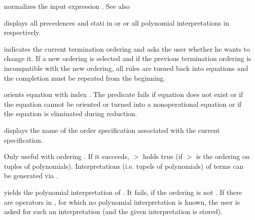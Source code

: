 \begin{command}
normalizes the input expression .
See also 
\end{command}


\begin{command}
displays all precedences and stati in  or  or
all polynomial interpretations in  respectively.
\end{command}

\begin{command}
indicates the current termination ordering and asks the user whether he wants to 
change it.
If a new ordering is selected and if the previous termination
ordering is incompatible with the new ordering, all rules are turned back into
equations and the completion must be repeated from the beginning.
\end{command}

\begin{command}
orients equation with index . The predicate fails if equation 
 does
not exist or if the equation cannot be oriented or turned into a nonoperational
equation or if the equation is eliminated during reduction.
\end{command}

\begin{command}
displays the name of the order specification associated with
the current specification.
\end{command}

\begin{command}
Only useful with ordering .
If it succeeds,  $>$  holds true
(if $>$ is the ordering on tuples of polynomials).
Interpretations (i.e. tupels of polynomials) of terms can be generated
via .
\end{command}

\begin{command}
yields the polynomial interpretation of . It
fails, if the ordering is not . 
If there are operators in ,
for which no polynomial interpretation is known, the user is asked for
such an interpretation (and the given interpretation is stored).
\end{command}


